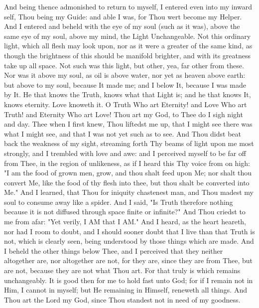 \documentclass[b5paper,openright,12pt,twoside]{book}
\begin{document}
And being thence admonished to return to myself, I entered even into my
inward self, Thou being my Guide: and able I was, for Thou wert become
my Helper. And I entered and beheld with the eye of my soul (such as
it was), above the same eye of my soul, above my mind, the Light
Unchangeable. Not this ordinary light, which all flesh may look upon,
nor as it were a greater of the same kind, as though the brightness of
this should be manifold brighter, and with its greatness take up all
space. Not such was this light, but other, yea, far other from these.
Nor was it above my soul, as oil is above water, nor yet as heaven above
earth: but above to my soul, because It made me; and I below It, because
I was made by It. He that knows the Truth, knows what that Light is;
and he that knows It, knows eternity. Love knoweth it. O Truth Who art
Eternity! and Love Who art Truth! and Eternity Who art Love! Thou art
my God, to Thee do I sigh night and day. Thee when I first knew, Thou
liftedst me up, that I might see there was what I might see, and that I
was not yet such as to see. And Thou didst beat back the weakness of my
sight, streaming forth Thy beams of light upon me most strongly, and I
trembled with love and awe: and I perceived myself to be far off from
Thee, in the region of unlikeness, as if I heard this Thy voice from on
high: "I am the food of grown men, grow, and thou shalt feed upon Me;
nor shalt thou convert Me, like the food of thy flesh into thee, but
thou shalt be converted into Me." And I learned, that Thou for iniquity
chastenest man, and Thou madest my soul to consume away like a spider.
And I said, "Is Truth therefore nothing because it is not diffused
through space finite or infinite?" And Thou criedst to me from afar:
"Yet verily, I AM that I AM." And I heard, as the heart heareth, nor had
I room to doubt, and I should sooner doubt that I live than that Truth
is not, which is clearly seen, being understood by those things which
are made. And I beheld the other things below Thee, and I perceived that
they neither altogether are, nor altogether are not, for they are, since
they are from Thee, but are not, because they are not what Thou art. For
that truly is which remains unchangeably. It is good then for me to hold
fast unto God; for if I remain not in Him, I cannot in myself; but He
remaining in Himself, reneweth all things. And Thou art the Lord my God,
since Thou standest not in need of my goodness.
\end{document}
